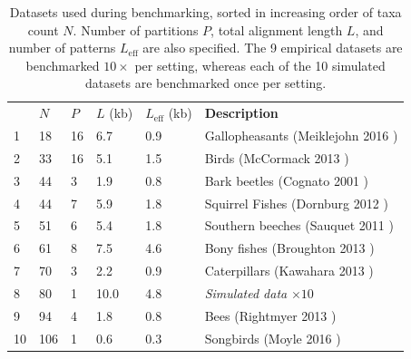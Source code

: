 \documentclass[10pt,letterpaper]{article}
\begin{document}
\begin{table}[h!]
\centering
\begin{tabular}{|l| l l l l l|} 
 \hline
  & $N$ & $P$ & $L$ (kb) & $L_\text{eff}$ (kb) & \textbf{Description} \\
 

1  &  18  &  16  &  6.7  &  0.9  &  Gallopheasants (Meiklejohn 2016 \cite{Meiklejohn_2016}) \\ 

2  &  33  &  16  &  5.1  &  1.5  &  Birds (McCormack 2013 \cite{McCormack_2013}) \\ 

3  &  44  &  3  &  1.9  &  0.8  &  Bark beetles (Cognato 2001 \cite{Cognato_2001}) \\ 

4  &  44  &  7  &  5.9  &  1.8  &  Squirrel Fishes (Dornburg 2012 \cite{Dornburg_2012}) \\ 

5  &  51  &  6  &  5.4  &  1.8  &  Southern beeches (Sauquet 2011 \cite{Sauquet_2011}) \\ 

6  &  61  &  8  &  7.5  & 4.6  &  Bony fishes (Broughton 2013 \cite{Broughton_2013}) \\ 

7  &  70  &  3  &  2.2  &  0.9  &  Caterpillars (Kawahara 2013 \cite{Kawahara_2013}) \\ 

8  &  80  &  1 &  10.0  &  4.8  &  \textit{Simulated data} $\times 10$ \\ 

9  &  94  &  4  &  1.8  &  0.8  &  Bees (Rightmyer 2013 \cite{Rightmyer_2013}) \\ 

10  &  106  &  1  &  0.6  &  0.3  & Songbirds (Moyle 2016 \cite{Moyle_2016}) \\ 




 \hline
\end{tabular}
\caption{Datasets used during benchmarking, sorted in increasing order of taxa count $N$. Number of partitions $P$, total alignment length $L$, and number of patterns $L_\text{eff}$ are also specified. The 9 empirical datasets are benchmarked $10 \times$ per setting, whereas each of the 10 simulated datasets are benchmarked once per setting.}
\label{table:datasets}
\end{table}
\end{document}
